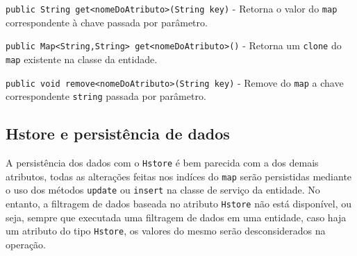 \texttt{public String get<nomeDoAtributo>(String key)} - Retorna o valor do
\texttt{map} correspondente à chave passada por parâmetro.

\texttt{public Map<String,String> get<nomeDoAtributo>()} - Retorna um
\texttt{clone} do \texttt{map} existente na classe da entidade.

\texttt{public void remove<nomeDoAtributo>(String key)} - Remove do \texttt{map}
a chave correspondente \texttt{string} passada por parâmetro.

\subsection{Hstore e persistência de dados}
A persistência dos dados com o \texttt{Hstore} é bem parecida com a dos demais
atributos, todas as alterações feitas nos indíces do \texttt{map} serão
persistidas mediante o uso dos métodos \texttt{update} ou \texttt{insert} na 
classe de serviço da entidade. No entanto, a filtragem de dados baseada no
atributo \texttt{Hstore} não está disponível, ou seja, sempre que executada uma
filtragem de dados em uma entidade, caso haja um atributo do tipo
\texttt{Hstore}, os valores do mesmo serão desconsiderados na operação.